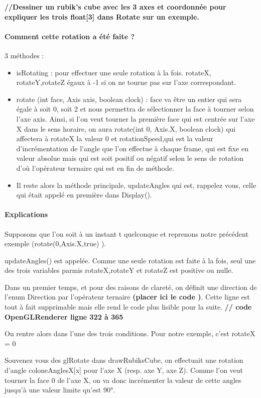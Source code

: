 \textbf{//Dessiner un rubik’s cube avec les 3 axes et coordonnée pour expliquer les trois float[3] dans Rotate sur un exemple.}

\paragraph{Comment cette rotation a été faite ?}
3 méthodes :
\begin{itemize}
    \item isRotating : pour effectuer une seule rotation à la fois. rotateX, rotateY,rotateZ égaux à -1 si on ne tourne pas sur l’axe correspondant.
    \item rotate (int face, Axis axis, boolean clock) :
face va être un entier qui sera égale à soit 0, soit 2 et nous permettra de sélectionner la face à tourner selon l’axe axis. Ainsi, si l’on veut tourner la première face qui est centrée sur l’axe X dans le sens horaire, on aura rotate(int 0, Axis.X, boolean clock) qui affectera à rotateX la valeur 0 et rotationSpeed,qui est la valeur d’incrémentation de l’angle que l’on effectue à chaque frame, qui est fixe en valeur absolue mais qui est soit positif ou négatif selon le sens de rotation d’où l’opérateur ternaire qui est en fin de méthode.
    \item Il reste alors la méthode principale, updateAngles qui est, rappelez vous, celle qui était appelé en première dans Display().
\end{itemize}

\paragraph{Explications}
Supposons que l’on soit à un instant t quelconque et reprenons notre précédent exemple (rotate(0,Axis.X,true) ).

updateAngles() est appelée. Comme une seule rotation est faite à la fois, seul une des trois variables parmis rotateX,rotateY et rotateZ est positive ou nulle.

Dans un premier temps, et pour des raisons de clareté, on définit une direction de l’enum Direction par l’opérateur ternaire \textbf{(placer ici le code )}. Cette ligne est tout à fait supprimable mais elle rend le code plus lisible pour la suite.
\textbf{// 	code OpenGLRenderer ligne 322 à 365}

On rentre alors dans l’une des trois conditions. Pour notre exemple, c’est rotateX = 0

Souvenez vous des glRotate dans drawRubiksCube, on effectuait une rotation d’angle coloneAnglesX[x] pour l’axe X (resp. axe Y, axe Z). Comme l’on veut tourner la face 0 de l’axe X, on va donc incrémenter la valeur de cette angles jusqu’à une valeur limite qu’est 90°.

